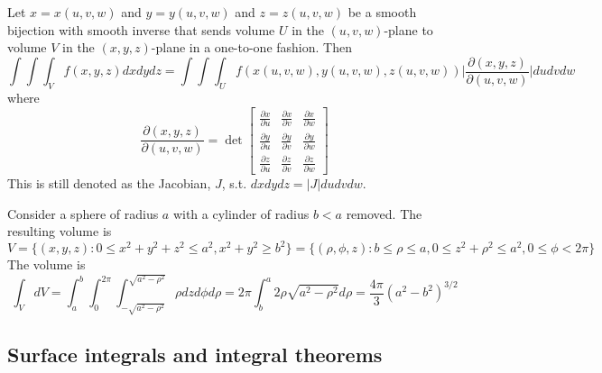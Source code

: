 \documentclass[a4paper]{article}
\begin{document}
\begin{prop}
Let $x=x(u,v,w)$ and $y=y(u,v,w)$ and $z=z(u,v,w)$ be a smooth bijection with smooth inverse that sends volume $U$ in the $(u,v,w)$-plane to volume $V$ in the $(x,y,z)$-plane in a one-to-one fashion. Then
\begin{equation}
    \int\int\int_Vf(x,y,z)dxdydz=\int\int\int_Uf(x(u,v,w),y(u,v,w),z(u,v,w))\bigg|\frac{\partial(x,y,z)}{\partial(u,v,w)}\bigg|dudvdw\tag{1.19a}
\end{equation}
where 
\begin{equation}
    \frac{\partial(x,y,z)}{\partial(u,v,w)}=\det\begin{bmatrix}\frac{\partial x}{\partial u}&\frac{\partial x}{\partial v}&\frac{\partial x}{\partial w}\\\frac{\partial y}{\partial u}&\frac{\partial y}{\partial v}&\frac{\partial y}{\partial w}\\\frac{\partial z}{\partial u}&\frac{\partial z}{\partial v}&\frac{\partial z}{\partial w}\end{bmatrix}\tag{1.19b}
\end{equation}
This is still denoted as the Jacobian, $J$, s.t. $dxdydz=|J|dudvdw$.
\end{prop}
\begin{eg}
Consider a sphere of radius $a$ with a cylinder of radius $b<a$ removed. The resulting volume is 
$$V=\{(x,y,z):0\leq x^2+y^2+z^2\leq a^2,x^2+y^2\geq b^2\}=\{(\rho,\phi,z):b\leq\rho\leq a,0\leq z^2+\rho^2\leq a^2,0\leq\phi<2\pi\}$$
The volume is
$$\int_VdV=\int_a^b\int_0^{2\pi}\int_{-\sqrt{a^2-\rho^2}}^{\sqrt{a^2-\rho^2}}\rho dzd\phi d\rho=2\pi\int_b^a2\rho\sqrt{a^2-\rho^2}d\rho=\frac{4\pi}{3}(a^2-b^2)^{3/2}$$
\end{eg}
\newpage
\subsection{Surface integrals and integral theorems}
\end{document}
